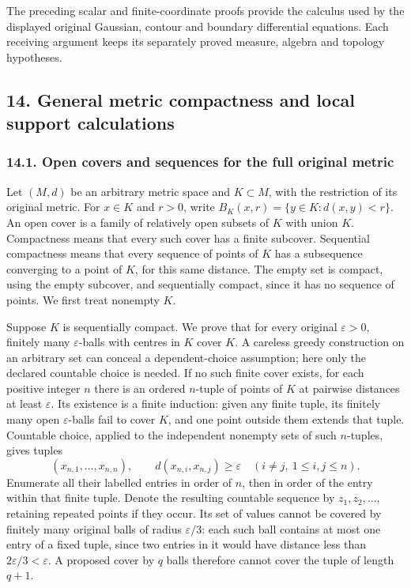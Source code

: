 \documentclass[
  11pt,
]{article}
\begin{document}
The preceding scalar and finite-coordinate proofs provide the calculus
used by the displayed original Gaussian, contour and boundary
differential equations. Each receiving argument keeps its separately
proved measure, algebra and topology hypotheses.

\subsection{14. General metric compactness and local support
calculations}\label{general-metric-compactness-and-local-support-calculations}

\subsubsection{14.1. Open covers and sequences for the full original
metric}\label{open-covers-and-sequences-for-the-full-original-metric}

Let \((M,d)\) be an arbitrary metric space and \(K\subset M\), with the
restriction of its original metric. For \(x\in K\) and \(r>0\), write
\(B_K(x,r)=\{y\in K:d(x,y)<r\}\). An open cover is a family of
relatively open subsets of \(K\) with union \(K\). Compactness means
that every such cover has a finite subcover. Sequential compactness
means that every sequence of points of \(K\) has a subsequence
converging to a point of \(K\), for this same distance. The empty set is
compact, using the empty subcover, and sequentially compact, since it
has no sequence of points. We first treat nonempty \(K\).

Suppose \(K\) is sequentially compact. We prove that for every original
\(\varepsilon>0\), finitely many \(\varepsilon\)-balls with centres in
\(K\) cover \(K\). A careless greedy construction on an arbitrary set
can conceal a dependent-choice assumption; here only the declared
countable choice is needed. If no such finite cover exists, for each
positive integer \(n\) there is an ordered \(n\)-tuple of points of
\(K\) at pairwise distances at least \(\varepsilon\). Its existence is a
finite induction: given any finite tuple, its finitely many open
\(\varepsilon\)-balls fail to cover \(K\), and one point outside them
extends that tuple. Countable choice, applied to the independent
nonempty sets of such \(n\)-tuples, gives tuples \[
 (x_{n,1},\ldots,x_{n,n}),\qquad
 d(x_{n,i},x_{n,j})\geq\varepsilon\quad(i\ne j,\ 1\leq i,j\leq n).
 \tag{GC1}
\] Enumerate all their labelled entries in order of \(n\), then in order
of the entry within that finite tuple. Denote the resulting countable
sequence by \(z_1,z_2,\ldots\), retaining repeated points if they occur.
Its set of values cannot be covered by finitely many original balls of
radius \(\varepsilon/3\): each such ball contains at most one entry of a
fixed tuple, since two entries in it would have distance less than
\(2\varepsilon/3<\varepsilon\). A proposed cover by \(q\) balls
therefore cannot cover the tuple of length \(q+1\).
\end{document}

